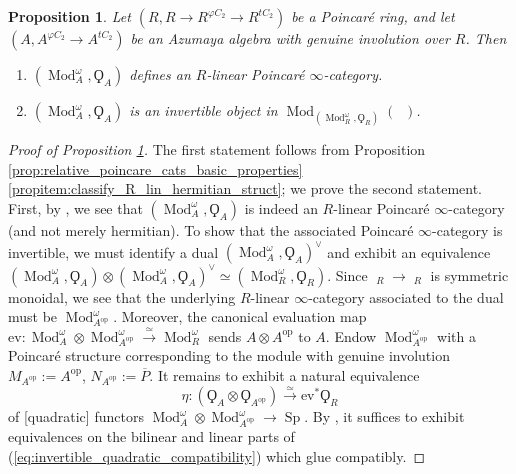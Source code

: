 \documentclass{article}
\DeclareMathOperator{\Cat}{\mathcal{C}at} %
\DeclareMathOperator{\Catex}{\Cat_\infty^{ex}} %
\DeclareMathOperator{\Catpidem}{Cat^p_{\infty, idem}} %
\DeclareMathOperator{\Mod}{Mod} %
\DeclareMathOperator{\Spectra}{Sp} %
\newcommand{\op}{\mathrm{op}} %
\newtheorem{proposition}[equation]{Proposition}
\theoremstyle{definition}
\begin{document}
\begin{proposition}\label{prop:mod_over_azumaya_geninv_is_invertible}
    Let $ (R, R \to R^{\varphi C_2} \to R^{tC_2} ) $ be a Poincaré ring, and let $ (A, A^{\varphi C_2} \to A^{tC_2}) $ be an Azumaya algebra with genuine involution over $ R $. 
    Then 
    \begin{enumerate}
        \item $ \left(\Mod_A^\omega, \Qoppa_A \right) $ defines an $ R $-linear Poincaré $ \infty $-category. 
        \item $ \left(\Mod_A^\omega, \Qoppa_A \right) $ is an invertible object in $ \Mod_{\left(\Mod_R^\omega, \Qoppa_R\right)}\left(\Catpidem\right) $. 
    \end{enumerate}
\end{proposition}
\begin{proof}[Proof of Proposition \ref{prop:mod_over_azumaya_geninv_is_invertible}]
    The first statement follows from Proposition \ref{prop:relative_poincare_cats_basic_properties}\ref{propitem:classify_R_lin_hermitian_struct}; we prove the second statement. 
    First, by \cite[Example 3.2.9]{CDHHLMNNSI}, we see that $ \left(\Mod_A^\omega, \Qoppa_A \right) $ is indeed an $ R$-linear Poincaré $ \infty $-category (and not merely hermitian). 
    To show that the associated Poincaré $ \infty $-category is invertible, we must identify a dual $ \left(\Mod_A^\omega, \Qoppa_A \right)^\vee $ and exhibit an equivalence $ \left(\Mod_A^\omega, \Qoppa_A \right) \otimes \left(\Mod_A^\omega, \Qoppa_A \right)^\vee \simeq \left(\Mod_R^\omega, \Qoppa_R \right) $. 
    Since $ \Catpidem_R \to \Catex_R $ is symmetric monoidal, we see that the underlying $ R $-linear $ \infty $-category associated to the dual must be $ \Mod_{A^\op}^\omega $. 
    Moreover, the canonical evaluation map $ \mathrm{ev} \colon \Mod_A^\omega \otimes \Mod_{A^\op}^\omega \xrightarrow{\simeq} \Mod_R^\omega $ sends $ A \otimes A^\op $ to $ A $. 
    Endow $ \Mod_{A^\op}^\omega $ with a Poincaré structure corresponding to the module with genuine involution $ M_{A^\op}:= A^\op $, $ N_{A^\op} := \overline{P} $. 
    It remains to exhibit a natural equivalence 
    \begin{equation}\label{eq:invertible_quadratic_compatibility}
        \eta \colon \left(\Qoppa_A \otimes \Qoppa_{A^\op}\right) \xrightarrow{\simeq} \mathrm{ev}^* \Qoppa_R 
    \end{equation} 
    of [quadratic] functors $ \Mod_A^\omega \otimes \Mod_{A^\op}^\omega \to \Spectra $. 
    By \cite[Theorem 3.3.1]{CDHHLMNNSI}, it suffices to exhibit equivalences on the bilinear and linear parts of (\ref{eq:invertible_quadratic_compatibility}) which glue compatibly. 

\end{proof}
\end{document}
